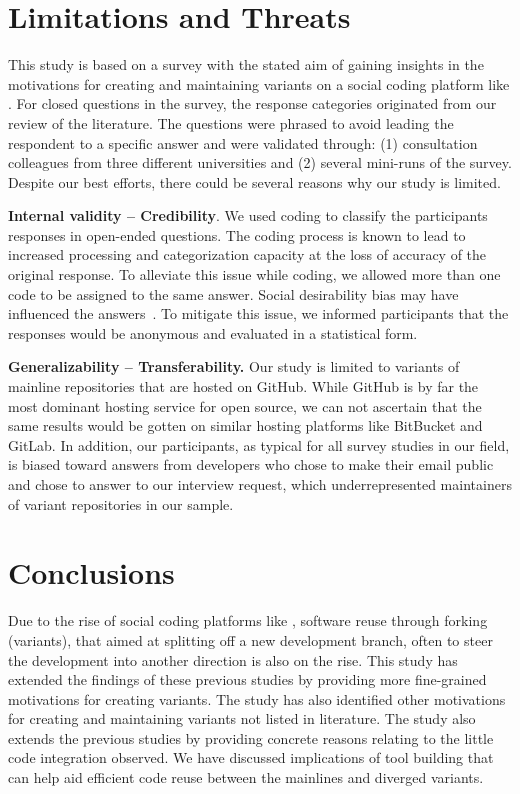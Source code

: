 \section{Limitations and Threats}
This study is based on a survey with the stated aim of gaining insights
in the motivations for creating and maintaining variants on a social coding platform like \gh.
For closed questions in the survey, the response categories originated from our review of the literature.
The questions were phrased to avoid leading the respondent to a specific answer and were validated through: (1) consultation colleagues from three different universities and (2) several mini-runs of the survey. Despite our best efforts, there could be several reasons why our study is limited.

\noindent \textbf{Internal validity -- Credibility}. We used coding to classify the participants responses in open-ended questions. The coding process is known to lead to increased processing and categorization capacity at the loss of accuracy of the original response. To alleviate this issue while coding, we allowed more than one code to be assigned to the same answer. 
Social desirability bias may have influenced the answers~\cite{Furnham:1986}. To mitigate this issue, we informed participants that the responses would be anonymous and evaluated in a statistical form.

\noindent \textbf{Generalizability – Transferability.} Our study is limited to variants of mainline repositories that are hosted on GitHub. While GitHub is by far the most dominant hosting service for open source, we can not ascertain that the same results would be gotten on similar hosting platforms like BitBucket and GitLab.
In addition, our participants, as typical for all survey studies in our field, is biased toward answers from developers who chose to make their email public and chose to answer to our interview request, which underrepresented maintainers of variant repositories in our sample.

\section{Conclusions}
Due to the rise of social coding platforms like \gh, software reuse through forking (variants), that aimed at splitting off a new development branch, often to steer the development into another direction is also on the rise. 
This study has extended the findings of these previous studies by providing more fine-grained motivations for creating variants. The study has also identified other motivations for creating and maintaining variants not listed in literature.
The study also extends the previous studies by providing concrete reasons relating to the little code integration observed.
We have discussed implications of tool building that can help aid efficient code reuse between the mainlines and diverged variants.
